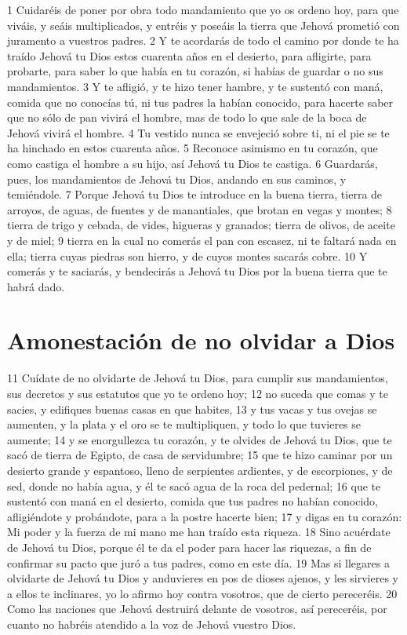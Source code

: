 1 Cuidaréis de poner por obra todo mandamiento que yo os ordeno hoy, para que viváis, y seáis multiplicados, y entréis y poseáis la tierra que Jehová prometió con juramento a vuestros padres.
2 Y te acordarás de todo el camino por donde te ha traído Jehová tu Dios estos cuarenta años en el desierto, para afligirte, para probarte, para saber lo que había en tu corazón, si habías de guardar o no sus mandamientos.
3 Y te afligió, y te hizo tener hambre, y te sustentó con maná, comida que no conocías tú, ni tus padres la habían conocido, para hacerte saber que no sólo de pan vivirá el hombre, mas de todo lo que sale de la boca de Jehová vivirá el hombre.
4 Tu vestido nunca se envejeció sobre ti, ni el pie se te ha hinchado en estos cuarenta años.
5 Reconoce asimismo en tu corazón, que como castiga el hombre a su hijo, así Jehová tu Dios te castiga.
6 Guardarás, pues, los mandamientos de Jehová tu Dios, andando en sus caminos, y temiéndole.
7 Porque Jehová tu Dios te introduce en la buena tierra, tierra de arroyos, de aguas, de fuentes y de manantiales, que brotan en vegas y montes;
8 tierra de trigo y cebada, de vides, higueras y granados; tierra de olivos, de aceite y de miel;
9 tierra en la cual no comerás el pan con escasez, ni te faltará nada en ella; tierra cuyas piedras son hierro, y de cuyos montes sacarás cobre.
10 Y comerás y te saciarás, y bendecirás a Jehová tu Dios por la buena tierra que te habrá dado.

\section{Amonestación de no olvidar a Dios}

11 Cuídate de no olvidarte de Jehová tu Dios, para cumplir sus mandamientos, sus decretos y sus estatutos que yo te ordeno hoy;
12 no suceda que comas y te sacies, y edifiques buenas casas en que habites,
13 y tus vacas y tus ovejas se aumenten, y la plata y el oro se te multipliquen, y todo lo que tuvieres se aumente;
14 y se enorgullezca tu corazón, y te olvides de Jehová tu Dios, que te sacó de tierra de Egipto, de casa de servidumbre;
15 que te hizo caminar por un desierto grande y espantoso, lleno de serpientes ardientes, y de escorpiones, y de sed, donde no había agua, y él te sacó agua de la roca del pedernal;
16 que te sustentó con maná en el desierto, comida que tus padres no habían conocido, afligiéndote y probándote, para a la postre hacerte bien;
17 y digas en tu corazón: Mi poder y la fuerza de mi mano me han traído esta riqueza.
18 Sino acuérdate de Jehová tu Dios, porque él te da el poder para hacer las riquezas, a fin de confirmar su pacto que juró a tus padres, como en este día.
19 Mas si llegares a olvidarte de Jehová tu Dios y anduvieres en pos de dioses ajenos, y les sirvieres y a ellos te inclinares, yo lo afirmo hoy contra vosotros, que de cierto pereceréis.
20 Como las naciones que Jehová destruirá delante de vosotros, así pereceréis, por cuanto no habréis atendido a la voz de Jehová vuestro Dios.

